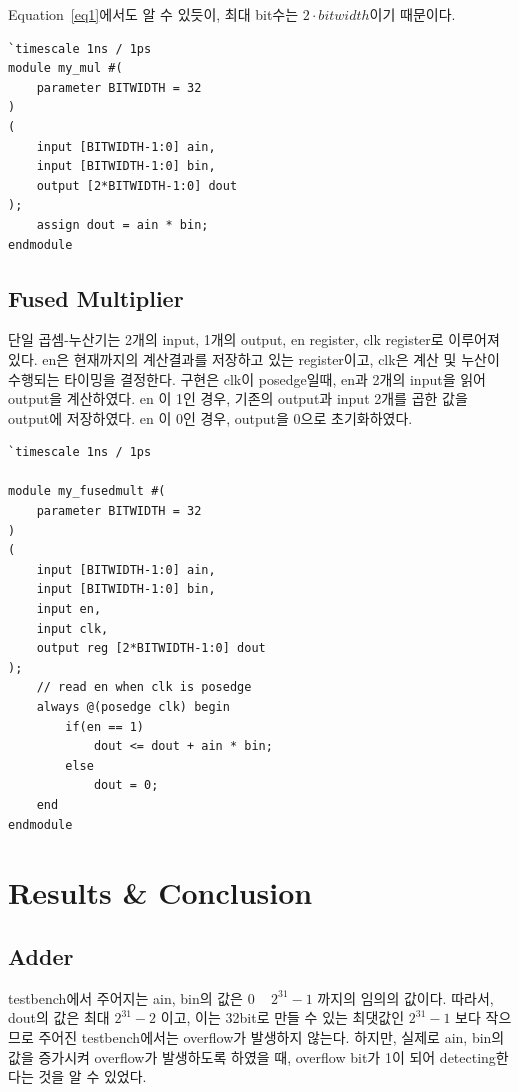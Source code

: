 \documentclass{article}
\begin{document}
Equation~\ref{eq1}에서도 알 수 있듯이, 최대 bit수는 $2 \cdot bitwidth$이기 때문이다.

\begin{lstlisting}[style={verilog-style}]
`timescale 1ns / 1ps
module my_mul #(
    parameter BITWIDTH = 32
)
(
    input [BITWIDTH-1:0] ain,
    input [BITWIDTH-1:0] bin,
    output [2*BITWIDTH-1:0] dout
);
    assign dout = ain * bin;
endmodule
\end{lstlisting}

\subsection{Fused Multiplier}

단일 곱셈-누산기는 2개의 input, 1개의 output, en register, clk register로 이루어져 있다.
en은 현재까지의 계산결과를 저장하고 있는 register이고, clk은 계산 및 누산이 수행되는 타이밍을 결정한다.
구현은 clk이 posedge일때, en과 2개의 input을 읽어 output을 계산하였다.
en 이 1인 경우, 기존의 output과 input 2개를 곱한 값을 output에 저장하였다.
en 이 0인 경우, output을 0으로 초기화하였다.

\begin{lstlisting}[style={verilog-style}]
`timescale 1ns / 1ps

module my_fusedmult #(
    parameter BITWIDTH = 32
)
(
    input [BITWIDTH-1:0] ain,
    input [BITWIDTH-1:0] bin,
    input en,
    input clk, 
    output reg [2*BITWIDTH-1:0] dout
);
    // read en when clk is posedge
    always @(posedge clk) begin
        if(en == 1)
            dout <= dout + ain * bin;
        else 
            dout = 0;
    end
endmodule

\end{lstlisting}

\section{Results \& Conclusion}

\subsection{Adder}
testbench에서 주어지는 ain, bin의 값은 0 ~ $2^{31}-1$ 까지의 임의의 값이다.
따라서, dout의 값은 최대 $2^{31}-2$  이고, 이는 32bit로 만들 수 있는 최댓값인 $2^{31}-1$  보다 작으므로 주어진 testbench에서는 overflow가 발생하지 않는다.
하지만, 실제로 ain, bin의 값을 증가시켜 overflow가 발생하도록 하였을 때, overflow bit가 1이 되어 detecting한다는 것을 알 수 있었다.
\end{document}
